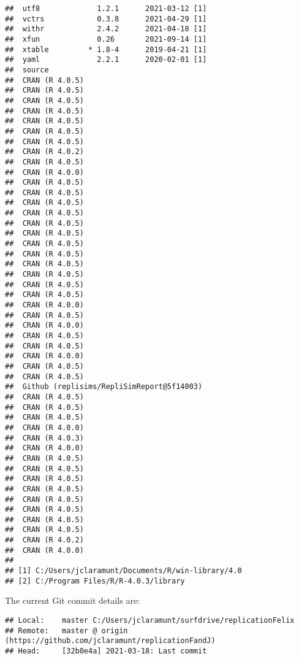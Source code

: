 \documentclass[10,a4paperpaper,]{article}
\begin{document}
\begin{verbatim}
##  utf8             1.2.1      2021-03-12 [1]
##  vctrs            0.3.8      2021-04-29 [1]
##  withr            2.4.2      2021-04-18 [1]
##  xfun             0.26       2021-09-14 [1]
##  xtable         * 1.8-4      2019-04-21 [1]
##  yaml             2.2.1      2020-02-01 [1]
##  source                                   
##  CRAN (R 4.0.5)                           
##  CRAN (R 4.0.5)                           
##  CRAN (R 4.0.5)                           
##  CRAN (R 4.0.5)                           
##  CRAN (R 4.0.5)                           
##  CRAN (R 4.0.5)                           
##  CRAN (R 4.0.5)                           
##  CRAN (R 4.0.2)                           
##  CRAN (R 4.0.5)                           
##  CRAN (R 4.0.0)                           
##  CRAN (R 4.0.5)                           
##  CRAN (R 4.0.5)                           
##  CRAN (R 4.0.5)                           
##  CRAN (R 4.0.5)                           
##  CRAN (R 4.0.5)                           
##  CRAN (R 4.0.5)                           
##  CRAN (R 4.0.5)                           
##  CRAN (R 4.0.5)                           
##  CRAN (R 4.0.5)                           
##  CRAN (R 4.0.5)                           
##  CRAN (R 4.0.5)                           
##  CRAN (R 4.0.5)                           
##  CRAN (R 4.0.0)                           
##  CRAN (R 4.0.5)                           
##  CRAN (R 4.0.0)                           
##  CRAN (R 4.0.5)                           
##  CRAN (R 4.0.5)                           
##  CRAN (R 4.0.0)                           
##  CRAN (R 4.0.5)                           
##  CRAN (R 4.0.5)                           
##  Github (replisims/RepliSimReport@5f14003)
##  CRAN (R 4.0.5)                           
##  CRAN (R 4.0.5)                           
##  CRAN (R 4.0.5)                           
##  CRAN (R 4.0.0)                           
##  CRAN (R 4.0.3)                           
##  CRAN (R 4.0.0)                           
##  CRAN (R 4.0.5)                           
##  CRAN (R 4.0.5)                           
##  CRAN (R 4.0.5)                           
##  CRAN (R 4.0.5)                           
##  CRAN (R 4.0.5)                           
##  CRAN (R 4.0.5)                           
##  CRAN (R 4.0.5)                           
##  CRAN (R 4.0.5)                           
##  CRAN (R 4.0.2)                           
##  CRAN (R 4.0.0)                           
## 
## [1] C:/Users/jclaramunt/Documents/R/win-library/4.0
## [2] C:/Program Files/R/R-4.0.3/library
\end{verbatim}

The current Git commit details are:

\begin{verbatim}
## Local:    master C:/Users/jclaramunt/surfdrive/replicationFelix
## Remote:   master @ origin (https://github.com/jclaramunt/replicationFandJ)
## Head:     [32b0e4a] 2021-03-18: Last commit
\end{verbatim}
\end{document}

